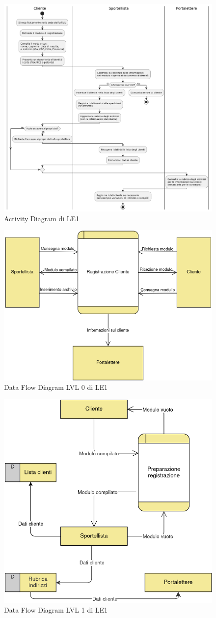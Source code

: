 \documentclass[a4paper,12pt]{article}
\begin{document}
\begin{figure}[H]
  \centering
  \includegraphics[width=0.8\linewidth]{assets/activitydiagram_LE1.png}
  \caption{Activity Diagram di LE1}
\end{figure}
\begin{figure}[H]
  \centering
  \includegraphics[width=0.7\linewidth]{assets/dataflow_lvl0_LE1.png}
  \caption{Data Flow Diagram LVL 0 di LE1}
\end{figure}
\begin{figure}[H]
  \centering
  \includegraphics[width=0.7\linewidth]{assets/dataflow_lvl1_LE1.png}
  \caption{Data Flow Diagram LVL 1 di LE1}
\end{figure}
\end{document}
